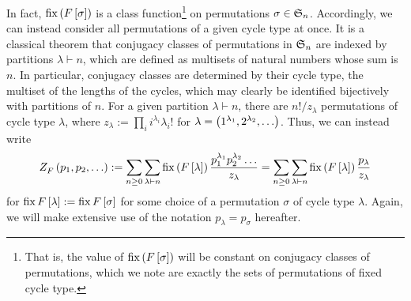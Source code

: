 \documentclass[distribution,draft]{brandiss} %
\numberwithin{section}{chapter}
\numberwithin{figure}{chapter}
\begin{document}
In fact, $\operatorname{fix} \left( {F \left[ {\sigma} \right]} \right)$ is a class function\footnote{That is, the value of $\operatorname{fix} \left( {F \left[ {\sigma} \right]} \right)$ will be constant on conjugacy classes of permutations, which we note are exactly the sets of permutations of fixed cycle type.} on permutations $\sigma \in  \mathfrak{S}_{n} $.
Accordingly, we can instead consider all permutations of a given cycle type at once.
It is a classical theorem that conjugacy classes of permutations in $ \mathfrak{S}_{n} $ are indexed by partitions $\lambda \vdash n$, which are defined as multisets of natural numbers whose sum is $n$.
In particular, conjugacy classes are determined by their cycle type, the multiset of the lengths of the cycles, which may clearly be identified bijectively with partitions of $n$.
For a given partition $\lambda \vdash n$, there are $n! / z_{\lambda}$ permutations of cycle type $\lambda$, where $z_{\lambda} := \prod_{i} i^{\lambda_{i}} \lambda_{i}!$ for $\lambda = \left( {1^{\lambda_{1}}, 2^{\lambda_{2}}, \dots} \right)$.
Thus, we can instead write
\begin{equation}
  \label{eq:cycinddefpart}
   Z_{F}^{} \left( {p_{1}, p_{2}, \dots} \right)  := \sum_{n \geq 0} \sum_{\lambda \vdash n} \operatorname{fix} \left( {F \left[ {\lambda} \right]} \right) \frac{p_{1}^{\lambda_{1}} p_{2}^{\lambda_{2}} \dots}{z_{\lambda}} = \sum_{n \geq 0} \sum_{\lambda \vdash n} \operatorname{fix} \left( {F \left[ {\lambda} \right]} \right) \frac{p_{\lambda}}{z_{\lambda}}
\end{equation}
for $\operatorname{fix} F \left[ {\lambda} \right] := \operatorname{fix} F \left[ {\sigma} \right]$ for some choice of a permutation $\sigma$ of cycle type $\lambda$.
Again, we will make extensive use of the notation $p_{\lambda} = p_{\sigma}$ hereafter.
\end{document}
